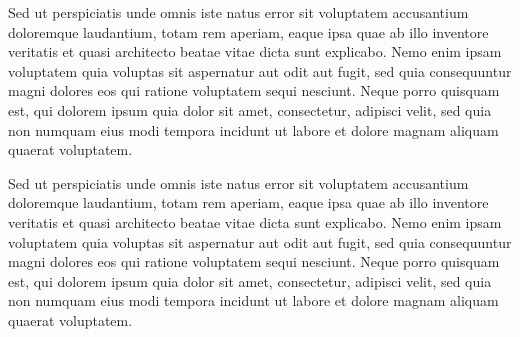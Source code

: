 Sed ut perspiciatis unde omnis iste natus error sit voluptatem accusantium doloremque laudantium, totam rem aperiam, eaque ipsa quae ab illo inventore veritatis et quasi architecto beatae vitae dicta sunt explicabo. Nemo enim ipsam voluptatem quia voluptas sit aspernatur aut odit aut fugit, sed quia consequuntur magni dolores eos qui ratione voluptatem sequi nesciunt. Neque porro quisquam est, qui dolorem ipsum quia dolor sit amet, consectetur, adipisci velit, sed quia non numquam eius modi tempora incidunt ut labore et dolore magnam aliquam quaerat voluptatem.



Sed ut perspiciatis unde omnis iste natus error sit voluptatem accusantium doloremque laudantium, totam rem aperiam, eaque ipsa quae ab illo inventore veritatis et quasi architecto beatae vitae dicta sunt explicabo. Nemo enim ipsam voluptatem quia voluptas sit aspernatur aut odit aut fugit, sed quia consequuntur magni dolores eos qui ratione voluptatem sequi nesciunt. Neque porro quisquam est, qui dolorem ipsum quia dolor sit amet, consectetur, adipisci velit, sed quia non numquam eius modi tempora incidunt ut labore et dolore magnam aliquam quaerat voluptatem.

